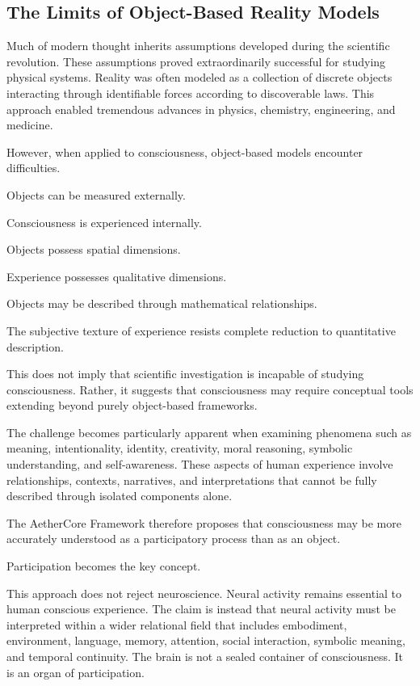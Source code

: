 \documentclass[12pt]{article}
\begin{document}
\subsection{The Limits of Object-Based Reality Models}

Much of modern thought inherits assumptions developed during the scientific revolution. These assumptions proved extraordinarily successful for studying physical systems. Reality was often modeled as a collection of discrete objects interacting through identifiable forces according to discoverable laws. This approach enabled tremendous advances in physics, chemistry, engineering, and medicine.

However, when applied to consciousness, object-based models encounter difficulties.

Objects can be measured externally.

Consciousness is experienced internally.

Objects possess spatial dimensions.

Experience possesses qualitative dimensions.

Objects may be described through mathematical relationships.

The subjective texture of experience resists complete reduction to quantitative description.

This does not imply that scientific investigation is incapable of studying consciousness. Rather, it suggests that consciousness may require conceptual tools extending beyond purely object-based frameworks.

The challenge becomes particularly apparent when examining phenomena such as meaning, intentionality, identity, creativity, moral reasoning, symbolic understanding, and self-awareness. These aspects of human experience involve relationships, contexts, narratives, and interpretations that cannot be fully described through isolated components alone.

The AetherCore Framework therefore proposes that consciousness may be more accurately understood as a participatory process than as an object.

Participation becomes the key concept.

This approach does not reject neuroscience. Neural activity remains essential to human conscious experience. The claim is instead that neural activity must be interpreted within a wider relational field that includes embodiment, environment, language, memory, attention, social interaction, symbolic meaning, and temporal continuity. The brain is not a sealed container of consciousness. It is an organ of participation.
\end{document}
